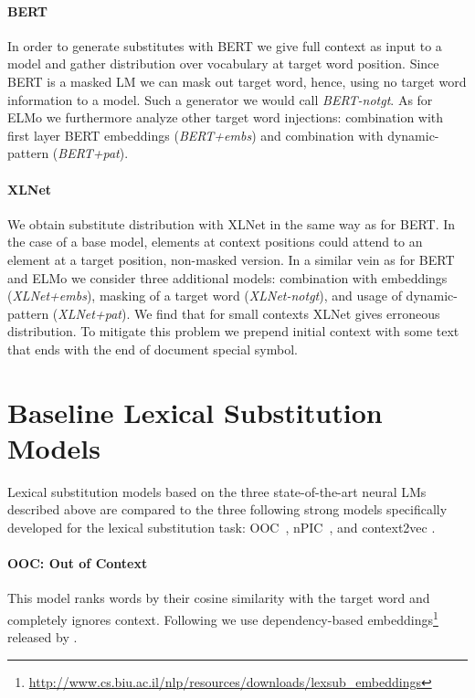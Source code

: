 \documentclass[11pt,a4paper]{article}
\begin{document}
\paragraph{BERT} In order to generate substitutes with BERT we give full context as input to a model and gather distribution over vocabulary at target word position. Since BERT is a masked LM we can mask out target word, hence, using no target word information to a model. Such a generator we would call \textit{BERT-notgt}. As for ELMo we furthermore analyze other target word injections: combination with first layer BERT embeddings (\textit{BERT+embs}) and combination with dynamic-pattern (\textit{BERT+pat}).

\paragraph{XLNet} We obtain substitute distribution with XLNet in the same way as for BERT. In the case of a base model, elements at context positions could attend to an element at a target position, non-masked version. In a similar vein as for BERT and ELMo we consider three additional models: combination with embeddings (\textit{XLNet+embs}), masking of a target word (\textit{XLNet-notgt}), and usage of dynamic-pattern  (\textit{XLNet+pat}). We find that for small contexts XLNet gives erroneous distribution. To mitigate this problem we prepend initial context with some text that ends with the end of document special symbol.

\section{Baseline Lexical Substitution Models}

Lexical substitution models based on the three state-of-the-art neural LMs described above are compared to the three following strong models specifically developed for the lexical substitution task: OOC~\cite{pic}, nPIC~\cite{pic}, and context2vec \cite{c2v}.

\paragraph{OOC: Out of Context}

This model ranks words by their cosine similarity with the target word and completely ignores context. Following \cite{pic} we use dependency-based embeddings\footnote{\url{http://www.cs.biu.ac.il/nlp/resources/downloads/lexsub_embeddings}} released by \cite{melamud-etal-2015-simple}.
\end{document}
